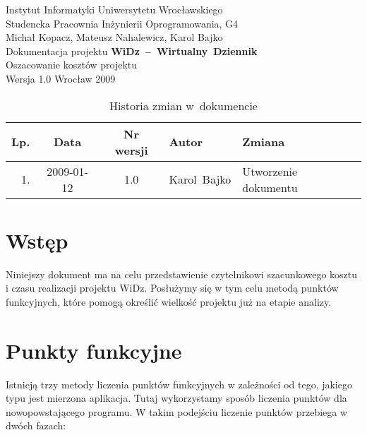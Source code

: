 \documentclass[12pt,leqno,twoside]{mwart}
\begin{document}
\begin{titlepage}
\begin{center}
Instytut Informatyki Uniwersytetu Wrocławskiego \\
Studencka Pracownia Inżynierii Oprogramowania, G4 \\
\vspace{4cm}
\Large Michał Kopacz, Mateusz Nahalewicz, Karol Bajko \\
\vspace{0.5cm}
\huge Dokumentacja projektu \mbox{\textbf{WiDz -- Wirtualny Dziennik}} \\ \Large Oszacowanie kosztów projektu\\
\vspace{1cm}
\normalsize Wersja 1.0
\vfill
\normalsize Wrocław 2009
\end{center}
\end{titlepage}

\newpage
\vfill
\renewcommand*{\tablename}{Tabela}
\begin{table}[tb]
	\centering
	\caption{Historia zmian w~dokumencie}
		\begin{tabular}{|r|c|c|p{}|l|}
		\hline
		Lp. 	& Data       & Nr wersji 	& Autor           		& Zmiana \\ \hline
		1.   	& 2009-01-12 & 1.0       	& \mbox{Karol Bajko} & Utworzenie dokumentu \\ \hline
		\end{tabular}
\end{table}

\tableofcontents
\newpage

\section{Wstęp}
\noindent Niniejszy dokument ma na celu przedstawienie czytelnikowi szacunkowego kosztu i czasu realizacji projektu WiDz. Posłużymy się w tym celu metodą punktów funkcyjnych, które pomogą określić wielkość projektu już na etapie analizy.

\section{Punkty funkcyjne}
\noindent Istnieją trzy metody liczenia punktów funkcyjnych w zależności od tego, jakiego typu jest mierzona aplikacja. Tutaj wykorzystamy sposób liczenia punktów dla nowopowstającego programu. W takim podejściu liczenie punktów przebiega w dwóch fazach:
\end{document}
